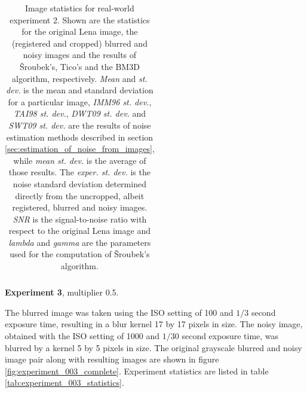 \documentclass[12pt,notitlepage]{report}
\begin{document}
\begin{table}[htb]
\begin{tabular}{ | l | c | c | c | c | c | c | }
  \end{tabular}
  \caption[Image statistics for real-world experiment 2]{Image statistics for real-world experiment 2. Shown are the statistics for the original Lena image, the (registered and cropped) blurred and noisy images and the results of Šroubek's, Tico's and the BM3D algorithm, respectively. {\em Mean} and {\em st. dev.} is the mean and standard deviation for a particular image, {\em IMM96 st. dev.}, {\em TAI98 st. dev.}, {\em DWT09 st. dev.} and {\em SWT09 st. dev.} are the results of noise estimation methods described in section \ref{sec:estimation_of_noise_from_images}, while {\em mean st. dev.} is the average of those results. The {\em exper. st. dev.} is the noise standard deviation determined directly from the uncropped, albeit registered, blurred and noisy images. {\em SNR} is the signal-to-noise ratio with respect to the original Lena image and {\em lambda} and {\em gamma} are the parameters used for the computation of Šroubek's algorithm.}
  \label{tab:experiment_002_statistics}
\end{table}

\noindent \textbf{Experiment 3}, multiplier 0.5.

The blurred image was taken using the ISO setting of 100 and $1/3$ second exposure time, resulting in a blur kernel 17 by 17 pixels in size. The noisy image, obtained with the ISO setting of 1000 and $1/30$ second exposure time, was blurred by a kernel 5 by 5 pixels in size. The original grayscale blurred and noisy image pair along with resulting images are shown in figure \ref{fig:experiment_003_complete}. Experiment statistics are listed in table \ref{tab:experiment_003_statistics}.
\end{document}
